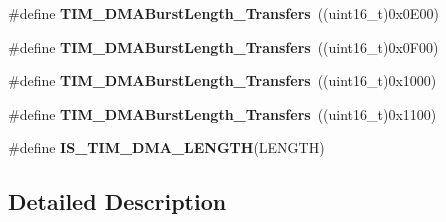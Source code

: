 \begin{DoxyCompactItemize}
\item 
\hypertarget{group___t_i_m___d_m_a___burst___length_gad13373f5fd246557a4fc487dc43c37ec}{\#define {\bfseries T\-I\-M\-\_\-\-D\-M\-A\-Burst\-Length\-\_\-Transfers}~((uint16\-\_\-t)0x0\-E00)}\label{group___t_i_m___d_m_a___burst___length_gad13373f5fd246557a4fc487dc43c37ec}

\item 
\hypertarget{group___t_i_m___d_m_a___burst___length_gafb644e6033f7b46c602b02754b69fde0}{\#define {\bfseries T\-I\-M\-\_\-\-D\-M\-A\-Burst\-Length\-\_\-Transfers}~((uint16\-\_\-t)0x0\-F00)}\label{group___t_i_m___d_m_a___burst___length_gafb644e6033f7b46c602b02754b69fde0}

\item 
\hypertarget{group___t_i_m___d_m_a___burst___length_ga5b2c97f650a3c1726965187d852b8cc5}{\#define {\bfseries T\-I\-M\-\_\-\-D\-M\-A\-Burst\-Length\-\_\-Transfers}~((uint16\-\_\-t)0x1000)}\label{group___t_i_m___d_m_a___burst___length_ga5b2c97f650a3c1726965187d852b8cc5}

\item 
\hypertarget{group___t_i_m___d_m_a___burst___length_gaed9f2afef174079f6eb6927abd995b9b}{\#define {\bfseries T\-I\-M\-\_\-\-D\-M\-A\-Burst\-Length\-\_\-Transfers}~((uint16\-\_\-t)0x1100)}\label{group___t_i_m___d_m_a___burst___length_gaed9f2afef174079f6eb6927abd995b9b}

\item 
\#define {\bfseries I\-S\-\_\-\-T\-I\-M\-\_\-\-D\-M\-A\-\_\-\-L\-E\-N\-G\-T\-H}(L\-E\-N\-G\-T\-H)
\end{DoxyCompactItemize}


\subsection{Detailed Description}


